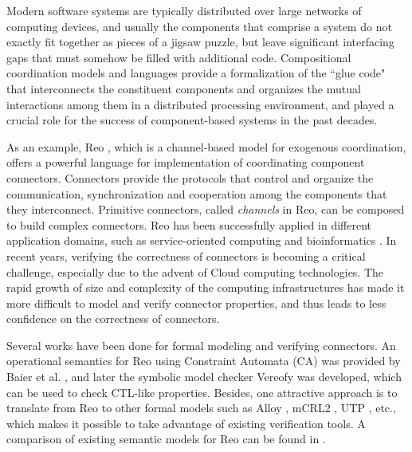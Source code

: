 \documentclass[3p,times]{elsarticle}
\begin{document}
Modern software systems are typically distributed over large networks of computing devices, and usually the components
that comprise a system do not exactly fit together as pieces of a jigsaw puzzle, but leave significant interfacing gaps
that must somehow be filled with additional code. Compositional coordination models and languages provide a formalization
of the ``glue code" that interconnects the constituent components and organizes the mutual interactions among them in a
distributed processing environment, and played a crucial role for the success of component-based systems in the past decades.

As an example, Reo \cite{Arb04}, which is a channel-based model for exogenous coordination, offers
a powerful language for implementation of coordinating component connectors. Connectors provide the protocols that control and organize
the communication, synchronization and cooperation among the components that they interconnect. Primitive connectors, called {\em channels}
in Reo, can be composed to build complex connectors. Reo has been successfully applied in different application domains, such as
service-oriented computing and bioinformatics \cite{CCA04,SA07}. In recent years,
verifying the correctness of connectors is becoming a critical challenge, especially due to the advent of Cloud computing
technologies. The rapid growth of size and complexity of the computing infrastructures has made it more difficult to model
and verify connector properties, and thus leads to less confidence on the correctness of connectors.


Several works have been done for formal modeling and verifying
connectors. An operational semantics for Reo using Constraint Automata
(CA) was provided by Baier et al. \cite{BSAR06}, and later the symbolic model checker Vereofy \cite{BBK+10} was developed,
which can be used to check CTL-like properties.
Besides, one attractive approach is to translate from Reo to other formal models such as Alloy
\cite{KSA+08}, mCRL2 \cite{KKV12}, UTP \cite{AAA+09,SAA+12}, etc.,
which makes it possible to take advantage of existing verification
tools. A comparison of existing semantic models for Reo can be found
in \cite{JA12}.
\end{document}
